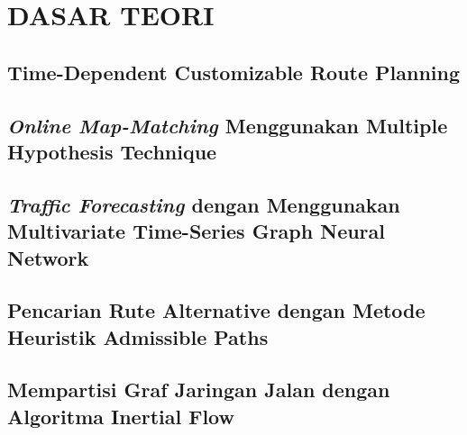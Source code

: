 \documentclass[ugmskripsi]{ugmskripsi}
\begin{document}


\chapter{DASAR TEORI}
\label{DASAR TEORI}

	\section{Time-Dependent Customizable Route Planning}
	\label{time dependent customizable route planning}
	

	\section{\textit{Online Map-Matching} Menggunakan Multiple Hypothesis Technique}
	\label{multiple hypothesis technique}
		

    \section{\textit{Traffic Forecasting} dengan Menggunakan Multivariate Time-Series Graph Neural Network}
    \label{mtgnn-section}
    
    
     \section{Pencarian Rute Alternative dengan Metode Heuristik Admissible Paths}
    \label{alternative-routes}
    

    \section{Mempartisi Graf Jaringan Jalan dengan Algoritma Inertial Flow}
    \label{alternative-routes}
    
\end{document}
